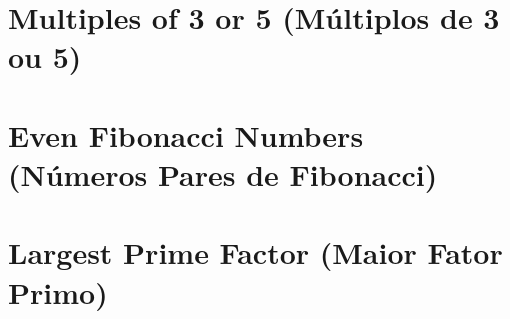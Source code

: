 \documentclass[12pt]{article}
\begin{document}
\tableofcontents

\newpage



\section{Multiples of 3 or 5 (Múltiplos de 3 ou 5)}
\label{sec:problem1}


\section{Even Fibonacci Numbers (Números Pares de Fibonacci)}
\label{sec:problem2}


\section{Largest Prime Factor (Maior Fator Primo)}
\label{sec:problem3}


% 
\end{document}
